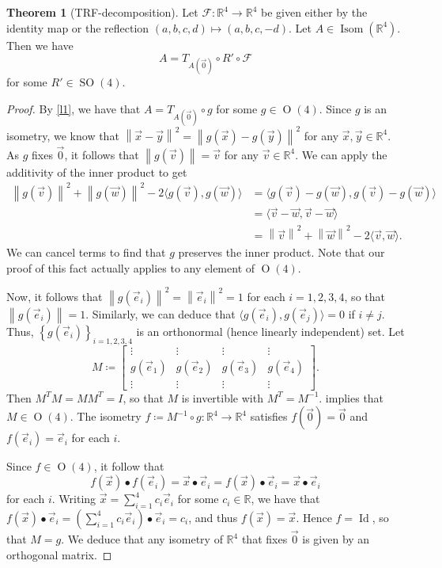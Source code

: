 \documentclass[10pt,letterpaper,cm]{nupset}
\theoremstyle{definition}
\theoremstyle{theorem}
\newtheorem{theorem}[definition]{Theorem}
\theoremstyle{remark}
\newcommand{\F}{\mathcal F}
\newcommand{\R}{\mathbb R}
\newcommand{\1}{\mathbf{1}}
\newcommand{\e}{\vec e}
\newcommand{\g}{\vec g}
\renewcommand{\v}{\vec v}
\newcommand{\w}{\vec w}
\newcommand{\x}{\vec x}
\newcommand{\y}{\vec y}
\newcommand{\0}{\vec {0}}
\DeclareMathOperator{\ORT}{O}
\DeclareMathOperator{\Id}{Id}
\DeclareMathOperator{\Isom}{Isom}
\DeclareMathOperator{\SO}{SO}
\begin{document}
\begin{theorem}[TRF-decomposition]\label{t1}
Let $\F:\R^4\to \R^4$ be given either by the identity map or the reflection $\left(a,b,c,d\right)\mapsto \left(a,b,c,{-d}\right)$. Let $A\in \Isom(\R^4)$. Then we have $$A=T_{A(\0)}\circ R' \circ  \F$$ for some $R'\in \SO(4)$.
\end{theorem}
\begin{proof}
 By \cref{l1}, we have that $A=T_{A(\0)}\circ g$ for some $g\in \ORT(4)$. Since $g$ is an isometry, we know that $ \left\lVert{\x-\y}\right\rVert^2= \left\lVert{g(\x)-g(\y)}\right\rVert^2$ for any $\x, \y\in \R^4$. As $g$ fixes $\0$, it follows that $ \left\lVert{g(\v)}\right\rVert=\v$ for any $\v\in \R^4$.
We can apply the additivity of the inner product to get  
\begin{align*}
 \left\lVert{g(\v)}\right\rVert^2+ \left\lVert{g(\w)}\right\rVert^2-2\langle g(\v), g(\w)\rangle & =\langle g(\v)-g(\w), g(\v)-g(\w)\rangle 
\\ & =\langle \v-\w, \v-\w\rangle
\\ & = \left\lVert{\v}\right\rVert^2+ \left\lVert{\w}\right\rVert^2-2\langle \v, \w\rangle.
\end{align*}  We can cancel terms to find that $g$ preserves the inner product. Note that our proof of this fact actually applies to any element of $\ORT(4)$.

Now, it follows that $ \left\lVert{g(\e_i)}\right\rVert^2= \left\lVert{\e_i}\right\rVert^2=1$ for each $i=1,2,3,4$, so that $ \left\lVert{g(\e_i)}\right\rVert=1$. Similarly,  we can deduce that  $\langle g(\e_i),g(\e_j)\rangle = 0$ if $i\ne j$. Thus, $\left\{g(\e_i)\right\}_{i=1,2,3,4}$ is an orthonormal (hence linearly independent) set.  Let $$M\coloneqq \begin{bmatrix} \vdots & \vdots & \vdots & \vdots \\g(\e_1) & g(\e_2) & g(\e_3) & g(\e_4) \\ \vdots & \vdots & \vdots & \vdots\end{bmatrix}.$$ Then $M^TM=MM^T=I$, so that $M$ is invertible with $M^T=M^{-1}$.   implies that $M\in \ORT(4)$. The isometry $f\coloneqq M^{-1}\circ g:\R^4 \to \R^4$ satisfies $f(\0)=\0$ and $f(\e_i)=\e_i$ for each $i$. 

Since $f\in \ORT(4)$, it follow that $$f(\x)\bullet f(\e_i) = \x \bullet \e_i=f(\x)\bullet \e_i=\x\bullet \e_i$$ for each $i$. Writing $\x=\sum_{i=1}^4 c_i\e_i$ for some $c_i\in \R$, we have that $f(\x)\bullet \e_i =\left(\sum_{i=1}^4 c_i\e_i\right) \bullet \e_i=c_i$, and thus $f(\x)=\x$. Hence $f=\Id$, so that $M=g$.  We deduce that any isometry of $\R^4$ that fixes $\0$ is given by an orthogonal matrix.


\end{proof}
\end{document}
